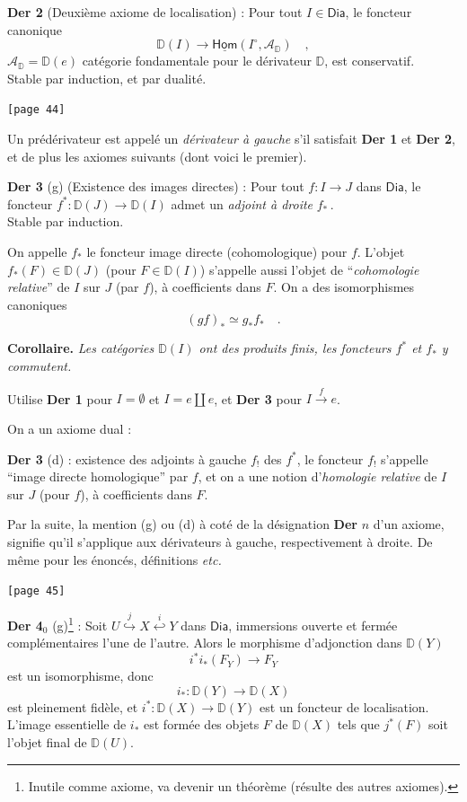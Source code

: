 \documentclass[11pt]{article}
\newcommand{\printedpage}[1]{\marginpar{\footnotesize p.~#1}}
\newcommand{\msp}[1]{\marginpar{\footnotesize [#1]}}
\newcommand{\D}{\mathbb{D}}
\newcommand{\Dia}{\mathsf{Dia}}
\begin{document}
\printedpage{24}

\noindent\textbf{Der 2} (Deuxième axiome de localisation) : Pour tout $I \in \Dia$, le foncteur canonique
\[ \D(I) \longrightarrow \underline{\mathsf{Hom}}(I^{\circ}, \mathcal{A}_{\D}) \quad , \]
$\mathcal{A}_{\D} = \D(e)$ catégorie fondamentale pour le dérivateur $\D$, est conservatif.\\
Stable par induction, et par dualité.

\noindent\msp{page 44}\texttt{[page 44]}

\noindent Un prédérivateur est appelé un \textit{dérivateur à gauche} s'il satisfait \textbf{Der 1} et \textbf{Der 2}, et de plus les axiomes suivants (dont voici le premier).

\noindent\textbf{Der 3} (g) (Existence des images directes) : Pour tout $f : I \to J$ dans $\Dia$, le foncteur $f^{*} : \D(J) \to \D(I)$ admet un \textit{adjoint à droite} $f_{*}$\,.\\
Stable par induction.

On appelle $f_{*}$ le foncteur image directe (cohomologique) pour $f$. L'objet $f_{*}(F) \in \D(J)$ (pour $F \in \D(I)$) s'appelle aussi l'objet de “\textit{cohomologie relative}” de $I$ sur $J$ (par $f$), à coefficients dans $F$. On a des isomorphismes canoniques
\[ (gf)_{*} \simeq g_{*} f_{*} \quad . \]

\noindent\textbf{Corollaire.} \textit{Les catégories $\D(I)$ ont des produits finis, les foncteurs $f^{*}$ et $f_{*}$ y commutent.}

Utilise \textbf{Der 1} pour $I = \emptyset$ et $I = e \amalg e$, et \textbf{Der 3} pour $I \xrightarrow{f} e$.

On a un axiome dual :

\noindent\textbf{Der 3} (d) : existence des adjoints à gauche $f_{!}$ des $f^{*}$, le foncteur $f_{!}$ s'appelle “image directe homologique” par $f$, et on a une notion d'\textit{homologie relative} de $I$ sur $J$ (pour $f$), à coefficients dans $F$.

Par la suite, la mention (g) ou (d) à coté de la désignation \textbf{Der} $n$ d'un axiome, %
signifie qu'il s'applique aux dérivateurs à gauche, respectivement à droite. De même pour les énoncés, définitions \textit{etc.}

\noindent\msp{page 45}\texttt{[page 45]}

\noindent\textbf{Der 4}$_{0}$ (g)\footnote[13]{Inutile comme axiome, va devenir un théorème (résulte des autres axiomes).} : Soit $U \overset{j}{\hookrightarrow} X \overset{i}{\hookleftarrow} Y$ dans $\Dia$, immersions ouverte et fermée complémentaires l'une de l'autre. Alors le morphisme d'adjonction dans $\D(Y)$
\[ i^{*} i_{*}(F_{Y}) \longrightarrow F_{Y} \]
est un isomorphisme, donc
\[ i_{*} : \D(Y) \longrightarrow \D(X) \]
est pleinement fidèle, et $i^{*} : \D(X) \to \D(Y)$ est un foncteur de localisation. L'image essentielle de $i_{*}$ est formée des objets $F$ de $\D(X)$ tels que $j^{*}(F)$ soit l'objet final de $\D(U)$.
\end{document}
